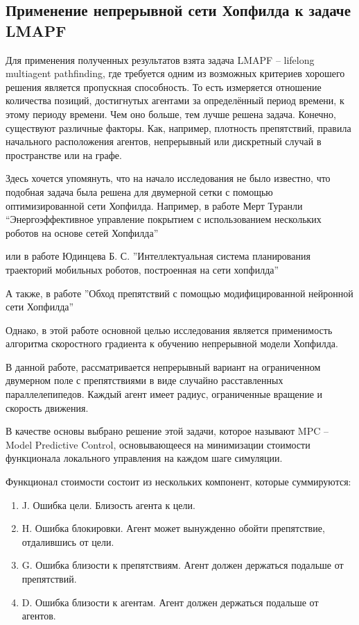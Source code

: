 
\subsection{\texorpdfstring{\textbf{
                  Применение непрерывной сети Хопфилда к задаче LMAPF}}
      {Применение непрерывной сети Хопфилда к задаче LMAPF}}

Для применения полученных результатов взята задача LMAPF -- lifelong
multiagent pathfinding, где требуется одним из возможных критериев
хорошего решения является пропускная способность. То есть измеряется
отношение количества позиций, достигнутых агентами за определённый
период времени, к этому периоду времени. Чем оно больше, тем лучше
решена задача. Конечно, существуют различные факторы. Как, например,
плотность препятствий, правила начального расположения агентов,
непрерывный или дискретный случай в пространстве или на графе.

Здесь хочется упомянуть, что на начало исследования не было известно,
что подобная задача была решена для двумерной сетки с помощью
оптимизированной сети Хопфилда. Например, в работе Мерт Туранли
``Энергоэффективное управление покрытием с использованием нескольких
роботов на основе сетей Хопфилда'' \cite{turanli2020multi}

или в работе Юдинцева Б. С. ''Интеллектуальная система планирования
траекторий мобильных роботов, построенная на сети хопфилда'' \cite{yudintsev2014intelligent}

А также, в работе ''Обход препятствий с помощью модифицированной
нейронной сети Хопфилда'' \cite{kin2008obstacle}

Однако, в этой работе основной целью исследования является применимость
алгоритма скоростного градиента к обучению непрерывной модели Хопфилда.

В данной работе, рассматривается непрерывный вариант на ограниченном
двумерном поле с препятствиями в виде случайно расставленных
параллелепипедов. Каждый агент имеет радиус, ограниченные вращение и
скорость движения.

В качестве основы выбрано решение этой задачи, которое называют MPC --
Model Predictive Control, основывающееся на минимизации стоимости
функционала локального управления на каждом шаге симуляции.

Функционал стоимости состоит из нескольких компонент, которые
суммируются:

\begin{enumerate}
      \def\labelenumi{\arabic{enumi}.}
      \item
            J. Ошибка цели. Близость агента к цели.
      \item
            H. Ошибка блокировки. Агент может вынужденно обойти препятствие, отдалившись от цели.
      \item
            G. Ошибка близости к препятствиям. Агент должен держаться подальше от препятствий.
      \item
            D. Ошибка близости к агентам. Агент должен держаться подальше от агентов.
\end{enumerate}

